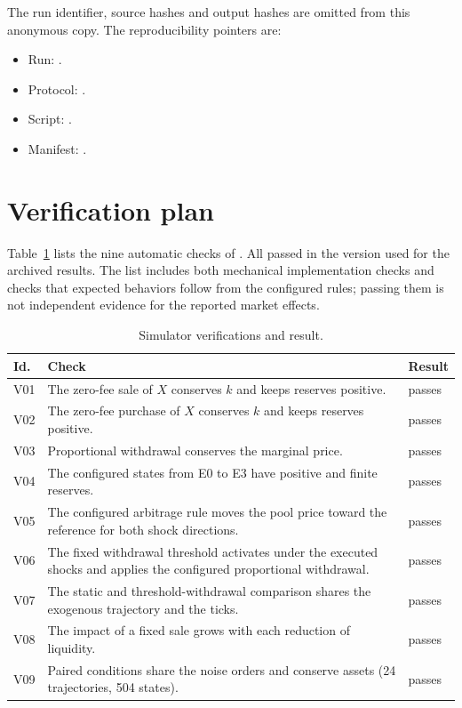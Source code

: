 \ifdefined\blindreviewmode
The run identifier, source hashes and output hashes are omitted from this anonymous copy.
\else
The reproducibility pointers are:
\begin{itemize}
  \item Run: .
  \item Protocol: .
  \item Script: .
  \item Manifest: .
\end{itemize}
\fi

\section{Verification plan}
\label{sec:verificacion}

Table~\ref{tab:verificacion} lists the nine automatic checks of . All passed in the version used for the archived results. The list includes both mechanical implementation checks and checks that expected behaviors follow from the configured rules; passing them is not independent evidence for the reported market effects.

\begin{table}[htbp]
\centering
\caption{Simulator verifications and result.}
\label{tab:verificacion}
\small
\begin{tabularx}{\textwidth}{@{}l X l@{}}
\toprule
Id. & Check & Result \\
\midrule
V01 & The zero-fee sale of $X$ conserves $k$ and keeps reserves positive. & passes \\
V02 & The zero-fee purchase of $X$ conserves $k$ and keeps reserves positive. & passes \\
V03 & Proportional withdrawal conserves the marginal price. & passes \\
V04 & The configured states from E0 to E3 have positive and finite reserves. & passes \\
V05 & The configured arbitrage rule moves the pool price toward the reference for both shock directions. & passes \\
V06 & The fixed withdrawal threshold activates under the executed shocks and applies the configured proportional withdrawal. & passes \\
V07 & The static and threshold-withdrawal comparison shares the exogenous trajectory and the ticks. & passes \\
V08 & The impact of a fixed sale grows with each reduction of liquidity. & passes \\
V09 & Paired conditions share the noise orders and conserve assets (24 trajectories, 504 states). & passes \\
\bottomrule
\end{tabularx}
\end{table}

